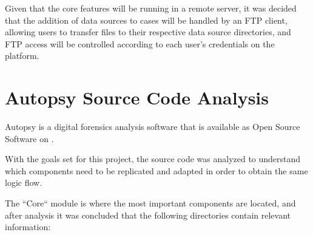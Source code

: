 Given that the core features will be running in a remote server, it was decided that the addition of data sources to cases will be handled by an FTP client, allowing users
to transfer files to their respective data source directories, and FTP access will be controlled according to each user's credentials on the platform.

\section{Autopsy Source Code Analysis}

Autopsy is a digital forensics analysis software that is available as Open Source Software \cite{opensource} on  \cite{github}.

With the goals set for this project, the source code was analyzed to understand which components need to be replicated and adapted in order to obtain the same logic flow.

The ``Core`` module is where the most important components are located, and after analysis it was concluded that the following directories contain relevant information:

